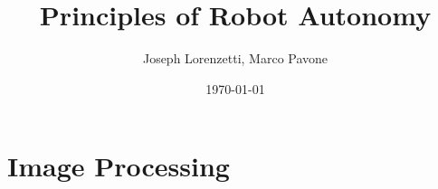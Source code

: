 \documentclass[nohyper,nobib]{tufte-book}
\title{Principles of Robot Autonomy}
\author{Joseph Lorenzetti, Marco Pavone}
\date{\today}
\begin{document}
\chapter{Image Processing}


\printbibliography
\end{document}
